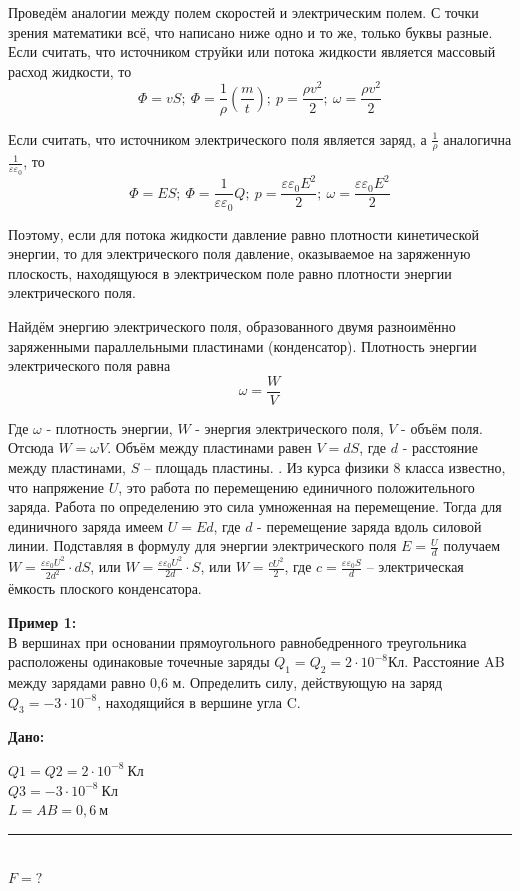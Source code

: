 \documentclass[a6paper, 11pt]{diss_4}
\renewcommand{\'}{\,'}
\begin{document}
  Проведём аналогии между полем скоростей и электрическим полем. С точки
зрения математики всё, что написано ниже одно и то же, только буквы разные.
Если считать, что источником струйки или потока жидкости является массовый
расход жидкости, то
\[
\Phi=vS;\
\Phi=\frac{1}{\rho}(\frac{m}{t});\
p=\frac{\rho v^2}{2};\
\omega=\frac{\rho v^2}{2}
\]

 Если считать, что источником электрического поля является заряд, а
$\frac{1}{\rho}$ аналогична $\frac{1}{\varepsilon\varepsilon_0}$, то
\[
\Phi=ES;\
\Phi=\frac{1}{\varepsilon\varepsilon_0}Q;\
p=\frac{\varepsilon\varepsilon_0 E^2}{2};\
\omega=\frac{\varepsilon\varepsilon_0 E^2}{2}
\]

 Поэтому, если для потока жидкости давление равно плотности кинетической
энергии, то для электрического поля давление, оказываемое на заряженную
плоскость, находящуюся в электрическом поле равно плотности энергии
электрического поля.

 Найдём энергию электрического поля, образованного двумя разноимённо заряженными
параллельными пластинами (конденсатор). Плотность энергии электрического поля
равна
\[
\omega=\frac{W}{V}
\]

  Где $\omega$ - плотность энергии, $W$ - энергия электрического поля, $V$ -
объём поля. Отсюда $W=\omega V$. Объём между пластинами равен $V=dS$, где $d$ -
 расстояние между пластинами, $S$ -- площадь пластины. . Из курса физики 8
класса известно, что напряжение $U$, это работа по перемещению единичного
положительного заряда. Работа по определению это сила умноженная на
перемещение. Тогда для единичного заряда имеем $U=Ed$, где $d$ - перемещение
заряда вдоль силовой линии. Подставляя в формулу для энергии электрического
поля $E=\frac{U}{d}$ получаем $W=\frac{\varepsilon\varepsilon_0U^2}{2d^2}\cdot
 dS$, или $W=\frac{\varepsilon\varepsilon_0U^2}{2d}\cdot S$, или
$W=\frac{cU^2}{2}$, где $c=\frac{\varepsilon\varepsilon_0S}{d}$ --
электрическая ёмкость плоского конденсатора.

\textbf{Пример 1:}\\

  В вершинах при основании прямоугольного равнобедренного треугольника
расположены одинаковые точечные заряды $Q_1 = Q_2 = 2\cdot10^{-8} Кл$.
Расстояние AB между зарядами равно 0,6 м. Определить силу, действующую на
заряд $Q_3=-3\cdot10^{-8}$, находящийся в вершине угла C.

\hspace{1cm}\textbf{Дано:}\hspace{.3cm}
\parbox[t]{4cm}{
$Q1 = Q2 = 2\cdot10^{-8}\ Кл$\\
$Q3 = -3\cdot10^{-8}\ Кл$\\
$L = AB = 0,6\ м$\\
\rule{4cm}{.4pt}\\
$F = ?$\\
}
\end{document}
